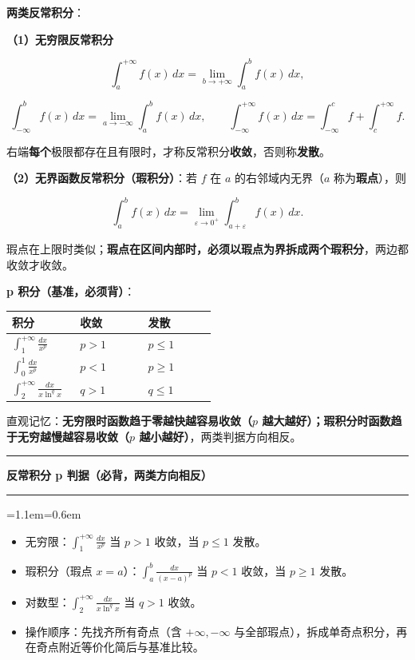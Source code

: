 \documentclass[11pt,openany,UTF8]{ctexbook}
\newcommand{\callouthead}[2]{%
  \par\addvspace{7pt}\noindent
  {\color{#1}\rule[-0.15em]{3pt}{1.05em}}\hspace{0.5em}%
  {\bfseries\color{#1}#2}\par\nobreak\vspace{-0.35em}%
  {\color{rulesep}\hrule height 0.4pt}\nobreak\vspace{0.45em}%
  \begingroup\small\setlength{\parindent}{0pt}%
  \leftskip=1.1em\rightskip=0.6em\noindent\ignorespaces}
\newcommand{\calloutend}{\par\endgroup\addvspace{7pt}}
\newenvironment{callkey}[1]{\callouthead{keybar}{#1}}{\calloutend}
\begin{document}
\textbf{两类反常积分}：

\textbf{（1）无穷限反常积分}

\[\int_a^{+\infty}f(x)\,dx=\lim_{b\to+\infty}\int_a^bf(x)\,dx,\]

\[\int_{-\infty}^{b}f(x)\,dx=\lim_{a\to-\infty}\int_a^bf(x)\,dx,\qquad \int_{-\infty}^{+\infty}f(x)\,dx=\int_{-\infty}^{c}f+\int_{c}^{+\infty}f.\]

右端\textbf{每个}极限都存在且有限时，才称反常积分\textbf{收敛}，否则称\textbf{发散}。

\textbf{（2）无界函数反常积分（瑕积分）}：若 $f$ 在 $a$ 的右邻域内无界（$a$ 称为\textbf{瑕点}），则

\[\int_a^bf(x)\,dx=\lim_{\varepsilon\to0^+}\int_{a+\varepsilon}^{b}f(x)\,dx.\]

瑕点在上限时类似；\textbf{瑕点在区间内部时，必须以瑕点为界拆成两个瑕积分}，两边都收敛才收敛。

\textbf{p 积分（基准，必须背）}：

\begingroup\small\setlength{\tabcolsep}{4.0pt}
\begin{longtable}{@{}L{0.3095\linewidth}L{0.3095\linewidth}L{0.3095\linewidth}@{}}
\toprule
\textbf{积分} & \textbf{收敛} & \textbf{发散} \\
\midrule
\endhead
$\displaystyle\int_1^{+\infty}\frac{dx}{x^p}$ & $p>1$ & $p\leq1$ \\
$\displaystyle\int_0^{1}\frac{dx}{x^p}$ & $p<1$ & $p\geq1$ \\
$\displaystyle\int_2^{+\infty}\frac{dx}{x\ln^qx}$ & $q>1$ & $q\leq1$ \\
\bottomrule
\end{longtable}
\endgroup

直观记忆：\textbf{无穷限时函数趋于零越快越容易收敛（$p$ 越大越好）；瑕积分时函数趋于无穷越慢越容易收敛（$p$ 越小越好）}，两类判据方向相反。

\begin{callkey}{反常积分 p 判据（必背，两类方向相反）}
\begin{itemize}
\item 无穷限：$\displaystyle\int_1^{+\infty}\frac{dx}{x^p}$ 当 $p>1$ 收敛，当 $p\leq1$ 发散。
\item 瑕积分（瑕点 $x=a$）：$\displaystyle\int_a^b\frac{dx}{(x-a)^p}$ 当 $p<1$ 收敛，当 $p\geq1$ 发散。
\item 对数型：$\displaystyle\int_2^{+\infty}\frac{dx}{x\ln^qx}$ 当 $q>1$ 收敛。
\item 操作顺序：先找齐所有奇点（含 $+\infty,-\infty$ 与全部瑕点），拆成单奇点积分，再在奇点附近等价化简后与基准比较。
\end{itemize}
\end{callkey}
\end{document}
